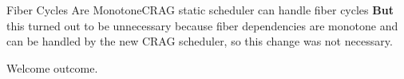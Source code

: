






\begin{frame}{Fiber Cycles Are Monotone}{CRAG static scheduler can handle fiber cycles}
    \textbf{But} this turned out to be \alert{unnecessary} because fiber dependencies are \alert{monotone} and can be handled by the new CRAG scheduler, so this change was not necessary. 

\newlinevspace
Welcome outcome.
    
\end{frame}

